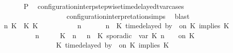 \begin{isabellebody}
\ \ \ \ \ \ \isamarkupfalse%
\ {\isacharquery}P\ \isamarkupfalse%
\ configuration{\isacharunderscore}interp{\isacharunderscore}stepwise{\isacharunderscore}timedelayed{\isacharunderscore}tvar{\isacharunderscore}cases\isanewline
\ \ \ \ \ \ \ \ \ \ \ \ \ \ \ \ \ \ \ \ configuration{\isacharunderscore}interpretation{\isachardot}simps\ \isamarkupfalse%
\ blast\isanewline
\ \ \ \ \isamarkupfalse%
\isanewline
\ \ \ \ \ \ \isamarkupfalse%
\ {\isasymGamma}\ n\ K\ {\isasymdelta}{\isasymtau}\ K\ K\ {\isasymPsi}\ {\isasymPhi}\isanewline
\ \ \ \ \ \ \isamarkupfalse%
\ {\isacartoucheopen}{\isacharparenleft}{\isasymGamma}\ n\ {\isasymturnstile}\ {\isasymPsi}\ {\isasymtriangleright}\ {\isasymPhi}\ {\isacharequal}\ {\isacharparenleft}{\isasymGamma}{\isacharcomma}\ n\ {\isasymturnstile}\ {\isacharparenleft}K\ time{\isacharminus}delayed{\isasymsharp}\ by\ {\isasymdelta}{\isasymtau}\ on\ K\ implies\ K\ {\isacharhash}\ {\isasymPsi}\ {\isasymtriangleright}\ {\isasymPhi}{\isacharparenright}{\isacartoucheclose}\isanewline
\ \ \ \ \ \ \ \ \ \ {\isacartoucheopen}{\isacharparenleft}{\isasymGamma}\ n\ {\isasymturnstile}\ {\isasymPsi}\ {\isasymtriangleright}\ {\isasymPhi}\ {\isacharequal}\ {\isacharparenleft}{\isacharparenleft}{\isacharparenleft}K\ {\isasymUp}\ n{\isacharparenright}\ {\isacharhash}\ {\isasymGamma}{\isacharparenright}{\isacharcomma}\ n\ {\isasymturnstile}\ {\isacharparenleft}K\ sporadic{\isasymsharp}\ {\isasymlparr}\ {\isasymtau}\isactrlsub v\isactrlsub a\isactrlsub r\ {\isacharparenleft}K\ n{\isacharparenright}\ {\isasymoplus}\ {\isasymdelta}{\isasymtau}\ {\isasymrparr}\ on\ K\ {\isacharhash}\isanewline
\ \ \ \ \ \ \ \ \ \ \ \ \ \ \ {\isasymPsi}\ {\isasymtriangleright}\ {\isacharparenleft}{\isacharparenleft}K\ time{\isacharminus}delayed{\isasymsharp}\ by\ {\isasymdelta}{\isasymtau}\ on\ K\ implies\ K\ {\isacharhash}\ {\isasymPhi}{\isacharparenright}{\isacharparenright}{\isacartoucheclose}\isanewline

\end{isabellebody}
